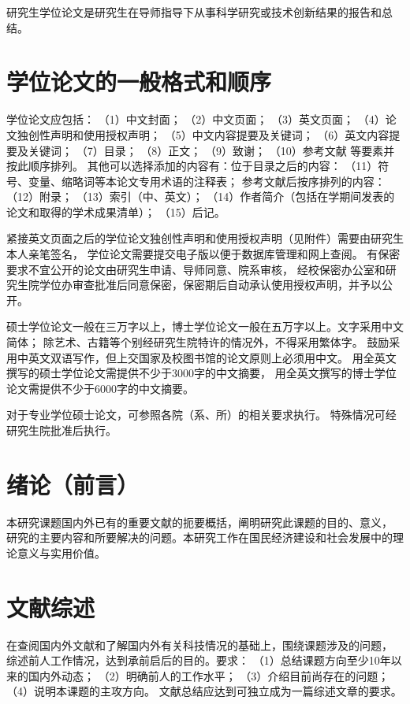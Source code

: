 研究生学位论文是研究生在导师指导下从事科学研究或技术创新结果的报告和总结。

\section{学位论文的一般格式和顺序}

学位论文应包括：
（1）中文封面；
（2）中文页面；
（3）英文页面；
（4）论文独创性声明和使用授权声明；
（5）中文内容提要及关键词；
（6）英文内容提要及关键词；
（7）目录；
（8）正文；
（9）致谢；
（10）参考文献
等要素并按此顺序排列。
其他可以选择添加的内容有：位于目录之后的内容：
（11）符号、变量、缩略词等本论文专用术语的注释表；
参考文献后按序排列的内容：
（12）附录；
（13）索引（中、英文）；
（14）作者简介（包括在学期间发表的论文和取得的学术成果清单）；
（15）后记。

紧接英文页面之后的学位论文独创性声明和使用授权声明（见附件）需要由研究生本人亲笔签名，
学位论文需要提交电子版以便于数据库管理和网上查阅。
有保密要求不宜公开的论文由研究生申请、导师同意、院系审核，
经校保密办公室和研究生院学位办审查批准后同意保密，保密期后自动承认使用授权声明，并予以公开。

硕士学位论文一般在三万字以上，博士学位论文一般在五万字以上。文字采用中文简体；
除艺术、古籍等个别经研究生院特许的情况外，不得采用繁体字。
鼓励采用中英文双语写作，但上交国家及校图书馆的论文原则上必须用中文。
用全英文撰写的硕士学位论文需提供不少于3000字的中文摘要，
用全英文撰写的博士学位论文需提供不少于6000字的中文摘要。

对于专业学位硕士论文，可参照各院（系、所）的相关要求执行。
特殊情况可经研究生院批准后执行。

\section{绪论（前言）}
本研究课题国内外已有的重要文献的扼要概括，阐明研究此课题的目的、意义，
研究的主要内容和所要解决的问题。本研究工作在国民经济建设和社会发展中的理论意义与实用价值。

\section{文献综述}
在查阅国内外文献和了解国内外有关科技情况的基础上，围绕课题涉及的问题，
综述前人工作情况，达到承前启后的目的。要求：
（1）总结课题方向至少10年以来的国内外动态；
（2）明确前人的工作水平；
（3）介绍目前尚存在的问题；
（4）说明本课题的主攻方向。
文献总结应达到可独立成为一篇综述文章的要求。

